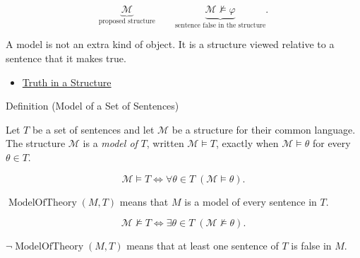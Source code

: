 \begin{remark*}
\[
\underbrace{\mathcal M}_{\text{proposed structure}}
\qquad
\underbrace{\mathcal M\not\models\varphi}_{\text{sentence false in the structure}}.
\]
\end{remark*}

\begin{remark*}[Interpretation]
A model is not an extra kind of object. It is a structure viewed relative to a
sentence that it makes true.
\end{remark*}

\begin{dependencies}
\begin{itemize}
  \item \hyperref[def:truth-structure]{Truth in a Structure}
\end{itemize}
\end{dependencies}

\begin{definitionbox}{Definition (Model of a Set of Sentences)}
\begin{definition}
\label{def:model-theory-set}
Let \(T\) be a set of sentences and let \(\mathcal M\) be a structure for their
common language. The structure \(\mathcal M\) is a \emph{model of} \(T\),
written \(\mathcal M\models T\), exactly when
\(\mathcal M\models\theta\) for every \(\theta\in T\).
\end{definition}
\end{definitionbox}

\begin{remark*}
\[
\mathcal M\models T
\Longleftrightarrow
\forall \theta\in T\;(\mathcal M\models\theta).
\]
\end{remark*}

\begin{remark*}
\(\operatorname{ModelOfTheory}(M,T)\) means that \(M\) is a model of every
sentence in \(T\).
\end{remark*}

\begin{remark*}
\[
\mathcal M\not\models T
\Longleftrightarrow
\exists \theta\in T\;(\mathcal M\not\models\theta).
\]
\end{remark*}

\begin{remark*}
\(\neg\operatorname{ModelOfTheory}(M,T)\) means that at least one sentence of
\(T\) is false in \(M\).
\end{remark*}

